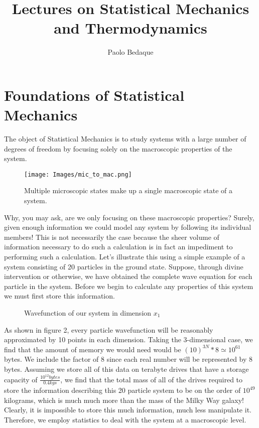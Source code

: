 \documentclass{article}
\title{Lectures on Statistical Mechanics and Thermodynamics}
\author{Paolo Bedaque}
\makeatletter
\def\lecture{\@ifnextchar[{\@lectureWith}{\@lectureWithout}}
\def\@lectureWith[#1]{\medbreak\refstepcounter{section}%
  \renewcommand{\leftmark}{Lecture \thesection}
  \noindent{\addcontentsline{toc}{section}{Lecture \thesection: #1\@addpunct{.}}%
  \sectionfont Lecture \thesection. #1\@addpunct{.}}\medbreak}
\def\@lectureWithout{\medbreak\refstepcounter{section}%
  \renewcommand{\leftmark}{Lecture \thesection}
  \noindent{\addcontentsline{toc}{section}{Lecture \thesection.}%
  \sectionfont Lecture \thesection.}\medbreak}
\makeatother
\begin{document}
\maketitle

\part{Foundations of Statistical Mechanics}

The object of Statistical Mechanics is to study systems with a large number of degrees of freedom by focusing solely on the macroscopic properties of the system.  

\begin{figure}
	\texttt{[image: Images/mic\_to\_mac.png]}
	\caption{Multiple microscopic states make up a single macroscopic state of a system.}
\end{figure}

Why, you may ask, are we only focusing on these macroscopic properties?  Surely, given enough information we could model any system by following its individual members!  This is not necessarily the case because the sheer volume of information necessary to do such a calculation is in fact an impediment to performing such a calculation.  Let's illustrate this using a simple example of a system consisting of 20 particles in the ground state.  Suppose, through divine intervention or otherwise, we have obtained the complete wave equation for each particle in the system.  Before we begin to calculate any properties of this system we must first store this information.  

\begin{figure}
\centering
	\begin{minipage}{0,49\textwidth}
		\caption{Wavefunction of our system in dimension $x_{1}$}
	\end{minipage}
\label{fig:information_graph}
\end{figure}

As shown in figure 2, every particle wavefunction will be reasonably approximated by 10 points in each dimension.  Taking the 3-dimensional case, we find that the amount of memory we would need would be $(10)^{3N}*8\simeq10^{61}$ bytes.  We include the factor of 8 since each real number will be represented by 8 bytes.  Assuming we store all of this data on terabyte drives that have a storage capacity of $\frac{10^{12} bytes}{0.4 kgs}$, we find that the total mass of all of the drives required to store the information describing this 20 particle system to be on the order of $10^{49}$ kilograms, which is much much more than the mass of the Milky Way galaxy!  Clearly, it is impossible to store this much information, much less manipulate it.  Therefore, we employ statistics to deal with the system at a macroscopic level. 
\end{document}
